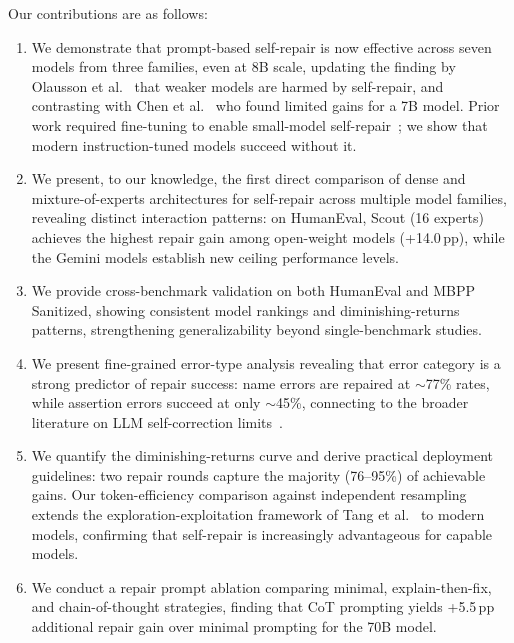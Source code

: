 \documentclass[conference]{IEEEtran}
\begin{document}
Our contributions are as follows:
\begin{enumerate}
    \item We demonstrate that prompt-based self-repair is now effective across seven models from three families, even at 8B scale, updating the finding by Olausson et al.~\cite{olausson2024selfrepair} that weaker models are harmed by self-repair, and contrasting with Chen et al.~\cite{chen2025revisit} who found limited gains for a 7B model. Prior work required fine-tuning to enable small-model self-repair~\cite{ding2024cycle, jiang2024ledex}; we show that modern instruction-tuned models succeed without it.

    \item We present, to our knowledge, the first direct comparison of dense and mixture-of-experts architectures for self-repair across multiple model families, revealing distinct interaction patterns: on HumanEval, Scout (16 experts) achieves the highest repair gain among open-weight models (+14.0\,pp), while the Gemini models establish new ceiling performance levels.

    \item We provide cross-benchmark validation on both HumanEval and MBPP Sanitized, showing consistent model rankings and diminishing-returns patterns, strengthening generalizability beyond single-benchmark studies.

    \item We present fine-grained error-type analysis revealing that error category is a strong predictor of repair success: name errors are repaired at $\sim$77\% rates, while assertion errors succeed at only $\sim$45\%, connecting to the broader literature on LLM self-correction limits~\cite{huang2024large}.

    \item We quantify the diminishing-returns curve and derive practical deployment guidelines: two repair rounds capture the majority (76--95\%) of achievable gains. Our token-efficiency comparison against independent resampling extends the exploration-exploitation framework of Tang et al.~\cite{tang2024repair} to modern models, confirming that self-repair is increasingly advantageous for capable models.

    \item We conduct a repair prompt ablation comparing minimal, explain-then-fix, and chain-of-thought strategies, finding that CoT prompting yields +5.5\,pp additional repair gain over minimal prompting for the 70B model.
\end{enumerate}
\end{document}
